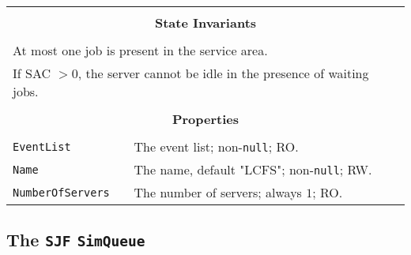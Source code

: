 \documentclass[12pt]{book}
\begin{document}
\begin{tabular}{|l|l|l|}
\hline
\multicolumn{3}{|c|}{} \\
\multicolumn{3}{|c|}{\bf State  Invariants} \\
\multicolumn{3}{|c|}{} \\
\hline
\multicolumn{3}{|l|}{At most one job is present in the service area.} \\
\multicolumn{3}{|l|}{If SAC $> 0$, the server cannot be idle in the presence of waiting jobs.} \\
\hline
\multicolumn{3}{|c|}{} \\
\multicolumn{3}{|c|}{\bf Properties} \\
\multicolumn{3}{|c|}{} \\
\hline
\lstinline|EventList|       & \multicolumn{2}{|l|}{The event list; non-\lstinline|null|; RO.} \\
\hline
\lstinline|Name|            & \multicolumn{2}{|l|}{The name, default "LCFS"; non-\lstinline|null|; RW.} \\
\hline
\lstinline|NumberOfServers| & \multicolumn{2}{|l|}{The number of servers; always $1$; RO.} \\
\hline
\end{tabular}

\subsection{The \lstinline{SJF} \lstinline{SimQueue}}
\end{document}
